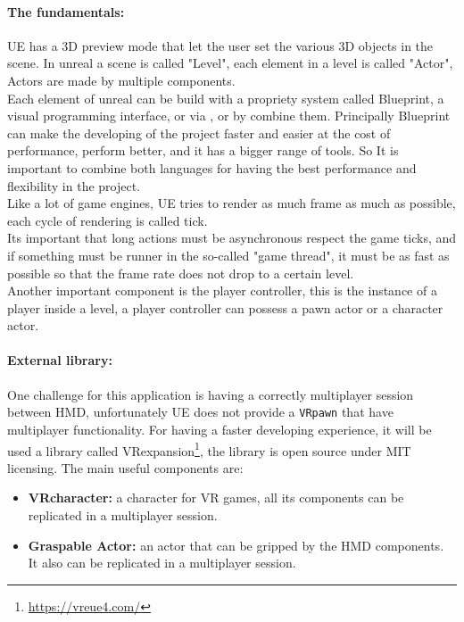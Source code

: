 \paragraph{The fundamentals:}
\ac{UE} has a 3D preview mode that let the user set the various 3D objects in the scene. 
In unreal a scene is called "Level", each element in a level is called "Actor", Actors are made by multiple components.\\
Each element of unreal can be build with a propriety system called Blueprint, a visual programming interface, or via \cpp, or by combine them.
Principally Blueprint can make the developing of the project faster and easier at the cost of performance, \cpp perform better, and it has a bigger range of tools.
So It is important to combine both languages for having the best performance and flexibility in the project.\\
Like a lot of game engines, \ac{UE} tries to render as much frame as much as possible, each cycle of rendering is called tick.\\
Its important that long actions must be asynchronous respect the game ticks, and if something must be runner in the so-called "game thread", it must be as fast as possible so that the frame rate does not drop to a certain level.\\
Another important component is the player controller, this is the instance of a player inside a level, a player controller can possess a pawn actor or a character actor. 

\paragraph{External library:}
One challenge for this application is having a correctly multiplayer session between \ac{HMD}, unfortunately \ac{UE} does not provide a \verb|VRpawn| that have multiplayer functionality.
For having a faster developing experience, it will be used a library called VRexpansion\footnote{\url{https://vreue4.com/}}, the library is open source under MIT licensing.
The main useful components are:
\begin{itemize}
  \item \textbf{VRcharacter:} a character for \ac{VR} games, all its components can be replicated in a multiplayer session.
  \item \textbf{Graspable Actor:} an actor that can be gripped by the \ac{HMD} components. It also can be replicated in a multiplayer session.
\end{itemize}

